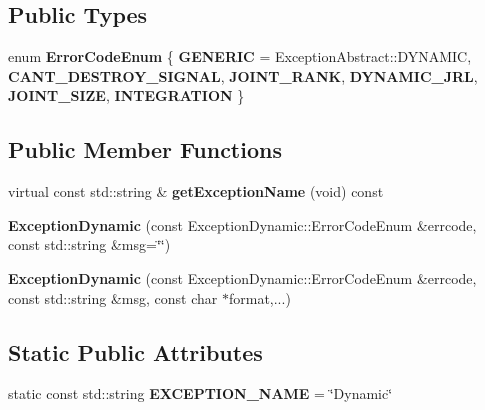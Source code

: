 \subsection*{Public Types}
\begin{DoxyCompactItemize}
\item 
\mbox{\label{classdynamic__graph_1_1ExceptionDynamic_a928d14f0f9bbd488f42a2d7577fb341b}} 
enum {\bfseries Error\+Code\+Enum} \{ \newline
{\bfseries G\+E\+N\+E\+R\+IC} = Exception\+Abstract\+:\+:D\+Y\+N\+A\+M\+IC, 
{\bfseries C\+A\+N\+T\+\_\+\+D\+E\+S\+T\+R\+O\+Y\+\_\+\+S\+I\+G\+N\+AL}, 
{\bfseries J\+O\+I\+N\+T\+\_\+\+R\+A\+NK}, 
{\bfseries D\+Y\+N\+A\+M\+I\+C\+\_\+\+J\+RL}, 
\newline
{\bfseries J\+O\+I\+N\+T\+\_\+\+S\+I\+ZE}, 
{\bfseries I\+N\+T\+E\+G\+R\+A\+T\+I\+ON}
 \}
\end{DoxyCompactItemize}
\subsection*{Public Member Functions}
\begin{DoxyCompactItemize}
\item 
\mbox{\label{classdynamic__graph_1_1ExceptionDynamic_ac27f4412b9c5f41ac2c01f607c0b54b6}} 
virtual const std\+::string \& {\bfseries get\+Exception\+Name} (void) const
\item 
\mbox{\label{classdynamic__graph_1_1ExceptionDynamic_a733c68c022311f9418a97fe1687c813a}} 
{\bfseries Exception\+Dynamic} (const Exception\+Dynamic\+::\+Error\+Code\+Enum \&errcode, const std\+::string \&msg=\char`\"{}\char`\"{})
\item 
\mbox{\label{classdynamic__graph_1_1ExceptionDynamic_a5f5cdec1772f2cbd833b0134bfcb0980}} 
{\bfseries Exception\+Dynamic} (const Exception\+Dynamic\+::\+Error\+Code\+Enum \&errcode, const std\+::string \&msg, const char $\ast$format,...)
\end{DoxyCompactItemize}
\subsection*{Static Public Attributes}
\begin{DoxyCompactItemize}
\item 
\mbox{\label{classdynamic__graph_1_1ExceptionDynamic_a29aa1b98aa4219a3a99ae314f2b8c1ef}} 
static const std\+::string {\bfseries E\+X\+C\+E\+P\+T\+I\+O\+N\+\_\+\+N\+A\+ME} = \char`\"{}Dynamic\char`\"{}
\end{DoxyCompactItemize}
